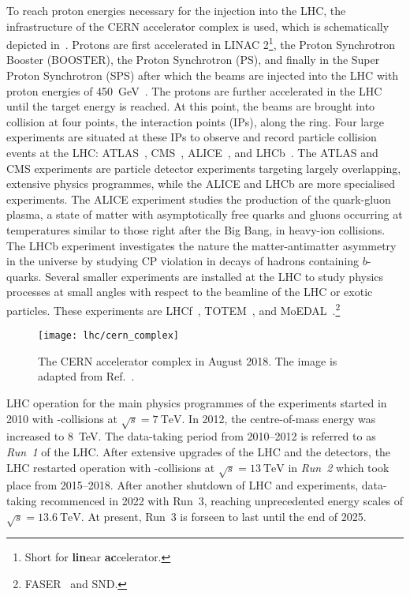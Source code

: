 To reach proton energies necessary for the injection into the LHC, the
infrastructure of the CERN accelerator complex is used, which is schematically
depicted in~. Protons are first accelerated
in LINAC 2\footnote{Short for \textbf{lin}ear \textbf{ac}celerator.}, the Proton
Synchrotron Booster (BOOSTER), the Proton Synchrotron (PS), and finally in the
Super Proton Synchrotron (SPS) after which the beams are injected into the LHC
with proton energies of \SI{450}{\GeV}~\cite{Evans:2008zzb}. The protons are
further accelerated in the LHC until the target energy is reached. At this
point, the beams are brought into collision at four points, the interaction
points (IPs), along the ring. Four large experiments are situated at these IPs
to observe and record particle collision events at the LHC:
ATLAS~\cite{PERF-2007-01}, CMS~\cite{CMS-CMS-00-001},
ALICE~\cite{ALICE:2008ngc}, and LHCb~\cite{LHCb:2008vvz}. The ATLAS and CMS
experiments are particle detector experiments targeting largely overlapping,
extensive physics programmes, while the ALICE and LHCb are more specialised
experiments. The ALICE experiment studies the production of the quark-gluon
plasma, a state of matter with asymptotically free quarks and gluons occurring
at temperatures similar to those right after the Big Bang, in heavy-ion
collisions. The LHCb experiment investigates the nature the matter-antimatter
asymmetry in the universe by studying CP violation in decays of hadrons
containing $b$-quarks. Several smaller experiments are installed at the LHC to
study physics processes at small angles with respect to the beamline of the LHC
or exotic particles. These experiments are LHCf~\cite{LHCf:2008lfy},
TOTEM~\cite{TOTEM:2008lue}, and
MoEDAL~\cite{MoEDAL:2009jwa}.\footnote{FASER~\cite{FASER:2019aik} and SND\@LHC.}

\begin{figure}[htbp]
  \centering

  \texttt{[image: lhc/cern\_complex]}

  \caption{The CERN accelerator complex in August 2018. The image is adapted
    from Ref.~\cite{Mobs:2684277}.}%
  \label{fig:cern_accelerator_complex}
\end{figure}

LHC operation for the main physics programmes of the experiments started in 2010
with \pp-collisions at $\sqrt{s} = \SI{7}{\TeV}$. In 2012, the centre-of-mass
energy was increased to \SI{8}{\TeV}. The data-taking period from 2010--2012 is
referred to as \emph{Run~1} of the LHC. After extensive upgrades of the LHC and
the detectors, the LHC restarted operation with \pp-collisions at
$\sqrt{s} = \SI{13}{\TeV}$ in \emph{Run~2} which took place from
2015--2018. After another shutdown of LHC and experiments, data-taking
recommenced in 2022 with Run~3, reaching unprecedented energy scales of
$\sqrt{s} = \SI{13.6}{\TeV}$. At present, Run~3 is forseen to last until the end
of 2025.

